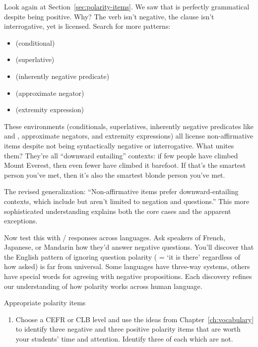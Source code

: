 Look again at Section~\ref{sec:polarity-items}. We saw that  is perfectly grammatical despite being positive. Why? The verb  isn't negative, the clause isn't interrogative, yet  is licensed. Search for more patterns:

\begin{itemize}[noitemsep]
   \item {} (conditional)
   \item {} (superlative)
   \item {} (inherently negative predicate)
   \item {} (approximate negator)
   \item {} (extremity expression)
\end{itemize}

These environments (conditionals, superlatives, inherently negative predicates like  and , approximate negators, and extremity expressions) all license non-affirmative items despite not being syntactically negative or interrogative. What unites them? They're all \enquote{downward entailing} contexts: if few people have climbed Mount Everest, then even fewer have climbed it barefoot. If that's the smartest person you've met, then it's also the smartest blonde person you've met.

The revised generalization: \enquote{Non-affirmative items prefer downward-entailing contexts, which include but aren't limited to negation and questions.} This more sophisticated understanding explains both the core cases and the apparent exceptions.

Now test this with / responses across languages. Ask speakers of French, Japanese, or Mandarin how they'd answer negative questions. You'll discover that the English pattern of ignoring question polarity ( = `it is there' regardless of how asked) is far from universal. Some languages have three-way systems, others have special words for agreeing with negative propositions. Each discovery refines our understanding of how polarity works across human language.


\begin{tblsframed}{Appropriate polarity items}
\begin{enumerate}[noitemsep, leftmargin=*]
    \item Choose a CEFR or CLB level and use the ideas from Chapter~\ref{ch:vocabulary} to identify three negative and three positive polarity items that are worth your students' time and attention. Identify three of each which are not.
\end{enumerate}
\end{tblsframed}

